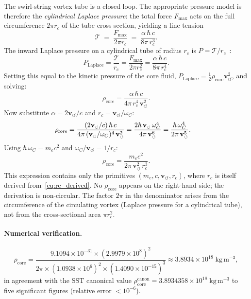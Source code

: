 \documentclass[11pt,a4paper]{article}
\newcommand{\rc}{r_c}
\newcommand{\vswirl}{\mathbf{v}_{\scriptscriptstyle\boldsymbol{\circlearrowleft}}}
\newcommand{\rhocore}{\rho_{\!\mathrm{core}}}
\newcommand{\omC}{\omega_C}
\begin{document}
The swirl-string vortex tube is a closed loop.  The appropriate
pressure model is therefore the \emph{cylindrical Laplace pressure}:
the total force $F_{\max}$ acts on the full circumference
$2\pi\rc$ of the tube cross-section, yielding a line tension
\begin{equation}
  \mathcal{T}
  \;=\; \frac{F_{\max}}{2\pi\rc}
  \;=\; \frac{\alpha\,\hbar\,c}{8\pi\,\rc^3}.
  \label{eq:line_tension}
\end{equation}
The inward Laplace pressure on a cylindrical tube of radius $\rc$ is
$P=\mathcal{T}/\rc$~\cite{Donnelly1991}:
\begin{equation}
  P_{\mathrm{Laplace}}
  = \frac{\mathcal{T}}{\rc}
  = \frac{F_{\max}}{2\pi\rc^2}
  = \frac{\alpha\,\hbar\,c}{8\pi\,\rc^4}.
  \label{eq:Plaplace}
\end{equation}
Setting this equal to the kinetic pressure of the core fluid,
$P_{\mathrm{Laplace}}=\tfrac{1}{2}\rhocore\vswirl^2$, and solving:
\begin{equation}
  \rhocore
  = \frac{\alpha\,\hbar\,c}{4\pi\,\rc^4\,\vswirl^2}.
  \label{eq:rhocore_alpha}
\end{equation}
Now substitute $\alpha=2\vswirl/c$
and $\rc=\vswirl/\omC$:
\begin{align}
  \rhocore
  &= \frac{(2\vswirl/c)\,\hbar\,c}
          {4\pi\,(\vswirl/\omC)^4\,\vswirl^2}
  = \frac{2\hbar\,\vswirl\,\omC^4}
          {4\pi\,\vswirl^6}
  = \frac{\hbar\,\omC^4}{2\pi\,\vswirl^5}.
  \notag
\end{align}
Using $\hbar\,\omC = m_e c^2$ and $\omC/\vswirl = 1/\rc$:
\begin{equation}
  \boxed{
    \rhocore
    = \frac{m_e c^2}{2\pi\,\vswirl^2\,\rc^3}.
  }
  \label{eq:rhocore_final}
\end{equation}
This expression contains only the primitives
$(m_e,c,\vswirl,\rc)$, where $\rc$ is itself derived
from~\eqref{eq:rc_derived}.  No $\rhocore$ appears on the right-hand
side; the derivation is non-circular.  The factor $2\pi$ in the
denominator arises from the circumference of the circulating vortex
(Laplace pressure for a cylindrical tube), not from the cross-sectional
area $\pi\rc^2$.

\paragraph{Numerical verification.}
\begin{equation}
  \rhocore
  = \frac{9.1094\times10^{-31}\times(2.9979\times10^8)^2}
         {2\pi\times(1.0938\times10^6)^2
          \times(1.4090\times10^{-15})^3}
  \approx 3.8934\times10^{18}\;\mathrm{kg\,m^{-3}},
  \label{eq:rhocore_numerical}
\end{equation}
in agreement with the SST canonical value
$\rhocore^{\mathrm{canon}}=3.8934358\times10^{18}\;\mathrm{kg\,m^{-3}}$
to five significant figures (relative error $<10^{-6}$).
\end{document}
